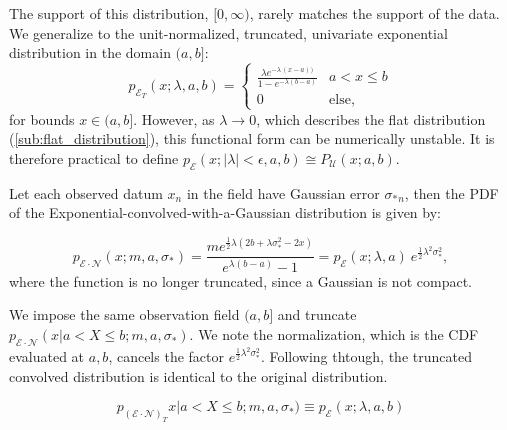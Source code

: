 \documentclass[twocolumn, linenumbers]{aastex631}
\newcommand{\mcal}[1]{\mathcal{#1}}
\newcommand{\Exp}[1]{e^{#1}}
\newcommand{\pdf}{p}
\newcommand{\sigobs}{{\sigma_*}}
\begin{document}
        The support of this distribution, $[0, \infty)$, rarely matches the
        support of the data. We generalize to the unit-normalized, truncated,
        univariate exponential distribution in the domain $(a, b]$:
        \begin{equation} \label{eq:pdf_truncexp_univariate}
            \pdf_{\mcal{E}_T}(x; \lambda, a, b) = \begin{cases}
                \frac{\lambda \Exp{-\lambda \, (x - a))}}{1 - \Exp{-\lambda(b - a)}} & a < x \leq b \\
                0 & \text{else},
            \end{cases}
        \end{equation}
        for bounds $x \in (a,b]$. However, as $\lambda \rightarrow 0$, which
        describes the flat distribution (\autoref{sub:flat_distribution}), this
        functional form can be numerically unstable. It is therefore practical
        to define $\pdf_{\mcal{E}}(x; |\lambda| < \epsilon, a, b) \cong
        P_{\mcal{U}}(x; a,b)$.

        Let each observed datum $x_n$ in the field have Gaussian error
        $\sigobs_n$, then the PDF of the Exponential-convolved-with-a-Gaussian
        distribution is given by:

        \begin{equation}
            \pdf_{\mcal{E}\cdot\mcal{N}}(x;m,a,\sigma_*) = \frac{m  e^{\frac{1}{2} \lambda  \left(2 b+\lambda  \sigma _*^2-2 x\right)}}{e^{\lambda  (b-a)}-1} = \pdf_{\mcal{E}}(x;\lambda,a) \ \Exp{\frac{1}{2}\lambda^2 \sigma_*^2},
        \end{equation}
        where the function is no longer truncated, since a Gaussian is not
        compact.

        We impose the same observation field $(a, b]$ and truncate
        $\pdf_{\mcal{E}\cdot\mcal{N}}(x | a < X \leq b;m,a,\sigma_*)$.  We note
        the normalization, which is the CDF evaluated at $a, b$, cancels the
        factor $\Exp{\frac{1}{2}\lambda^2 \sigma_*^2}$. Following thtough, the
        truncated convolved distribution is identical to the original
        distribution.

        \begin{equation}
            \pdf_{(\mcal{E}\cdot\mcal{N})_T}x | a < X \leq b;m,a,\sigma_*) \equiv \pdf_{\mcal{E}}(x; \lambda, a, b)
        \end{equation}

    \vspace{10pt}
\end{document}
